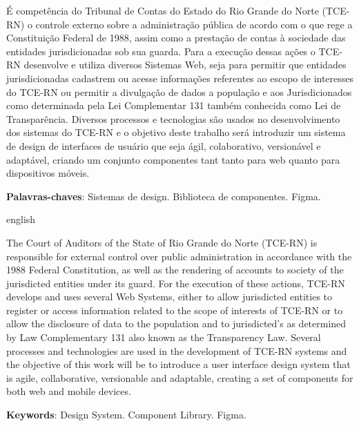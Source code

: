 \setlength{\absparsep}{18pt} %
\begin{resumo}

É competência do Tribunal de Contas do Estado do Rio Grande do Norte (TCE-RN) o controle externo sobre a administração pública de acordo com o que rege a Constituição Federal de 1988, assim como a prestação de contas à sociedade das entidades jurisdicionadas sob sua guarda. Para a execução dessas ações o TCE-RN desenvolve e utiliza diversos Sistemas Web, seja para permitir que entidades jurisdicionadas  cadastrem ou acesse informações referentes ao escopo de interesses do TCE-RN ou permitir a divulgação de dados a população e aos Jurisdicionados como determinada pela Lei Complementar 131 também conhecida como Lei de Transparência. Diversos processos e tecnologias são usados no desenvolvimento dos sistemas do TCE-RN e o objetivo deste trabalho será introduzir um sistema de design de interfaces de usuário que seja ágil, colaborativo, versionável e adaptável, criando um conjunto componentes tant tanto para web quanto para dispositivos móveis.
 
 \noindent
 \textbf{Palavras-chaves}: Sistemas de design. Biblioteca de componentes. Figma. 
\end{resumo}
\begin{resumo}[Abstract]
	\begin{otherlanguage*}{english}
	
	The Court of Auditors of the State of Rio Grande do Norte (TCE-RN) is responsible for external control over public administration in accordance with the 1988 Federal Constitution, as well as the rendering of accounts to society of the jurisdicted entities under its guard. For the execution of these actions, TCE-RN develops and uses several Web Systems, either to allow jurisdicted entities to register or access information related to the scope of interests of TCE-RN or to allow the disclosure of data to the population and to jurisdicted's as determined by Law Complementary 131 also known as the Transparency Law. Several processes and technologies are used in the development of TCE-RN systems and the objective of this work will be to introduce a user interface design system that is agile, collaborative, versionable and adaptable, creating a set of components for both web and mobile devices. 
	
	\vspace{\onelineskip}
	\noindent 
	\textbf{Keywords}: Design System. Component Library. Figma.
	\end{otherlanguage*}
\end{resumo}